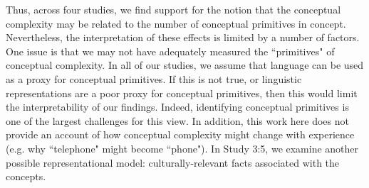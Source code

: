 Thus, across four studies, we find support for the notion that the conceptual complexity may be related to the number of conceptual primitives in concept.   Nevertheless, the interpretation of these effects is limited by a number of factors. One issue is  that we  may not have  adequately measured the ``primitives" of conceptual complexity. In all of our studies, we assume that language can be used as a proxy for conceptual primitives. If this is not true, or linguistic representations are a poor proxy for conceptual primitives, then this would limit the interpretability of our findings. Indeed, identifying  conceptual primitives is one of the largest challenges for this view. In addition, this work here does not provide an account of how conceptual complexity might change with experience (e.g. why ``telephone" might become ``phone").  In Study 3:5, we examine another possible representational model: culturally-relevant facts associated with the concepts. 


